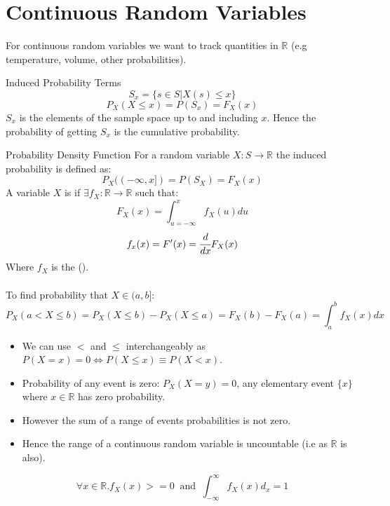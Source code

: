\chapter{Continuous Random Variables}

For continuous random variables we want to track quantities in $\mathbb{R}$ (e.g temperature, volume, other probabilities).
\begin{sidenotebox}{Induced Probability Terms}
	\[S_x = \{s \in S | X(s) \leq x\}\]
	\[P_X(X \leq x) = P(S_x) = F_X(x)\]
	$S_x$ is the elements of the sample space up to and including $x$. Hence the probability of getting $S_x$ is the cumulative probability.
\end{sidenotebox}
\begin{definitionbox}{Probability Density Function}
	For a random variable $X : S \to \mathbb{R}$ the induced probability is defined as:
	\[P_X((-\infty, x]) = P(S_X) = F_X(x)\]
	A variable $X$ is  if $\exists f_X : \mathbb{R} \to \mathbb{R}$ such that:
	\[F_X(x) = \int_{u = -\infty}^xf_X(u)du\]
	\[f_x(x) = F'(x) = \cfrac{d}{dx}F_X(x)\]
	Where $f_X$ is the  ().
	\\
	\\ To find probability that $X \in (a,b]$:
	\[P_X(a < X \leq b) = P_X(X \leq b) - P_X(X \leq a) = F_X(b) - F_X(a) = \int_a^bf_X(x)dx\]
	\begin{itemize}
		\item We can use $<$ and $\leq$ interchangeably as $P(X = x) = 0 \Leftrightarrow P(X \leq x) \equiv P(X < x)$.
		\item Probability of any event is zero: $P_X(X = y) = 0$, any elementary event $\{x\}$ where $x \in \mathbb{R}$ has zero probability.
		\item However the sum of a range of events probabilities is not zero.
		\item Hence the range of a continuous random variable is uncountable (i.e as $\mathbb{R}$ is also).
	\end{itemize}
	\[\forall x \in \mathbb{R}. f_X(x)>= 0 \ \text{ and } \ \int_{-\infty}^{\infty}f_X(x)d_x = 1\]
\end{definitionbox}
